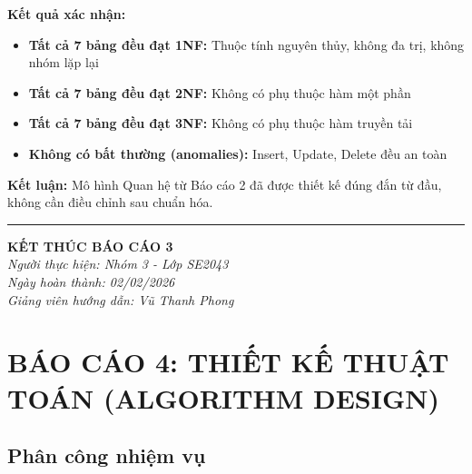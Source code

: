 \documentclass[12pt,a4paper]{article}
\begin{document}
\textbf{Kết quả xác nhận:}
\begin{itemize}
    \item \textbf{Tất cả 7 bảng đều đạt 1NF:} Thuộc tính nguyên thủy, không đa trị, không nhóm lặp lại
    \item \textbf{Tất cả 7 bảng đều đạt 2NF:} Không có phụ thuộc hàm một phần
    \item \textbf{Tất cả 7 bảng đều đạt 3NF:} Không có phụ thuộc hàm truyền tải
    \item \textbf{Không có bất thường (anomalies):} Insert, Update, Delete đều an toàn
\end{itemize}

\textbf{Kết luận:} Mô hình Quan hệ từ Báo cáo 2 đã được thiết kế đúng đắn từ đầu, không cần điều chỉnh sau chuẩn hóa.

\vspace{1cm}
\begin{center}
\rule{0.6\textwidth}{0.4pt}

\textbf{KẾT THÚC BÁO CÁO 3}\\
\vspace{0.5cm}
\textit{Người thực hiện: Nhóm 3 - Lớp SE2043}\\
\textit{Ngày hoàn thành: 02/02/2026}\\
\textit{Giảng viên hướng dẫn: Vũ Thanh Phong}
\end{center}

\newpage
\section{BÁO CÁO 4: THIẾT KẾ THUẬT TOÁN (ALGORITHM DESIGN)}

\subsection{Phân công nhiệm vụ}
\end{document}
